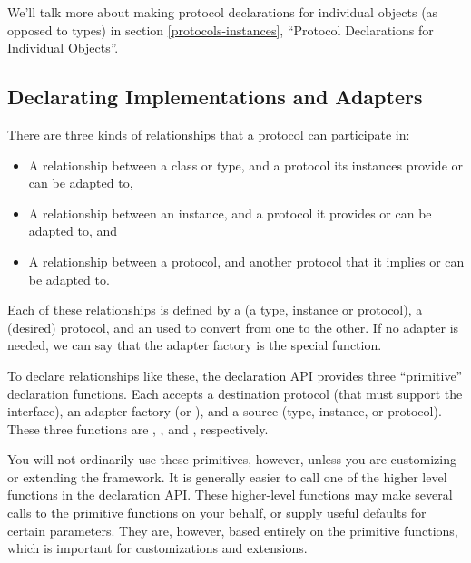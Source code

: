 \begin{verbatim%
}
\begin{verbatim%
}
\begin{verbatim%
}
\begin{verbatim%
}
\begin{verbatim%
}
\begin{verbatim%
}
\begin{description}
We'll talk more about making protocol declarations for individual objects
(as opposed to types) in section \ref{protocols-instances}, ``Protocol
Declarations for Individual Objects''.

\end{description}











\subsection{Declarating Implementations and Adapters}
There are three kinds of relationships that a protocol can participate in:

\begin{itemize}
\item A relationship between a class or type, and a protocol its instances
provide or can be adapted to,

\item A relationship between an instance, and a protocol it provides or can
be adapted to, and

\item A relationship between a protocol, and another protocol that it implies
or can be adapted to.
\end{itemize}

Each of these relationships is defined by a  (a type,
instance or protocol), a  (desired) protocol, and an
 used to convert from one to the other.  If no adapter
is needed, we can say that the adapter factory is the special
 function.

To declare relationships like these, the  declaration API
provides three ``primitive'' declaration functions.  Each accepts a destination
protocol (that must support the  interface),
an adapter factory (or ), and a source (type,
instance, or protocol).  These three functions are
, , and
, respectively.

You will not ordinarily use these primitives, however, unless you are
customizing or extending the framework.  It is generally easier to call one
of the higher level functions in the declaration API.  These higher-level
functions may make several calls to the primitive functions on your behalf, or
supply useful defaults for certain parameters.  They are, however, based
entirely on the primitive functions, which is important for customizations and
extensions.


\end{verbatim%
}
\end{verbatim%
}
\end{verbatim%
}
\end{verbatim%
}
\end{verbatim%
}
\end{verbatim%
}
